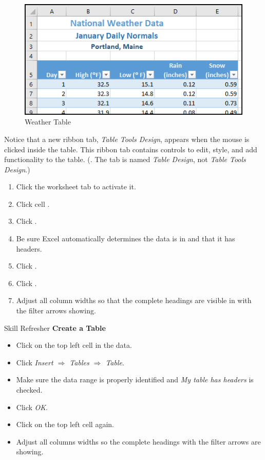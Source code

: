 \begin{figure}[H]
	\centering
	\includegraphics[width=\maxwidth{.95\linewidth}]{gfx/ch05_fig03}
	\caption{Weather Table}
	\label{05:fig03}
\end{figure}

Notice that a new ribbon tab, \textit{Table Tools Design}, appears when the mouse is clicked inside the table. This ribbon tab contains controls to edit, style, and add functionality to the table. (. The tab is named \textit{Table Design}, not \textit{Table Tools Design}.)

\begin{enumerate}
	\item Click the  worksheet tab to activate it.
	\item Click cell .
	\item Click .
	\item Be sure Excel automatically determines the data is in  and that it has headers.
	\item Click .
	\item Click .
	\item Adjust all column widths so that the complete headings are visible in  with the filter arrows showing. 
\end{enumerate}

\begin{center}
	\begin{sklbox}{Skill Refresher}
		\textbf{Create a Table}
		\\
		\begin{itemize}
			\setlength{\itemsep}{0pt}
			\setlength{\parskip}{0pt}
			\setlength{\parsep}{0pt}

			\item Click on the top left cell in the data.
			\item Click \textit{Insert $ \Rightarrow $ Tables $ \Rightarrow $ Table}.
			\item Make sure the data range is properly identified and \textit{My table has headers} is checked.
			\item Click \textit{OK}.
			\item Click on the top left cell again.
			\item Adjust all columns widths so the complete headings with the filter arrows are showing.
						
		\end{itemize}
	\end{sklbox}
\end{center}

